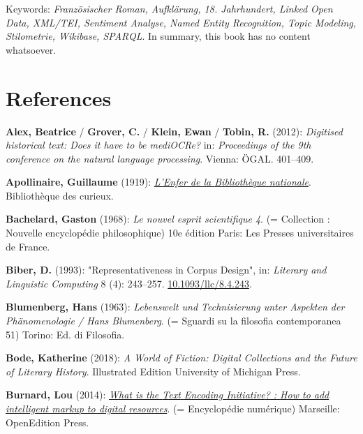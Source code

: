 \documentclass[
  12pt,
  letterpaper,
  DIV=11,
  numbers=noendperiod]{scrreprt}
\newlength{\cslhangindent}
\newenvironment{CSLReferences}[2] %
 {\begin{list}{}{%
  \setlength{\itemindent}{0pt}
  \setlength{\leftmargin}{0pt}
  \setlength{\parsep}{0pt}
  \ifodd #1
   \setlength{\leftmargin}{\cslhangindent}
   \setlength{\itemindent}{-1\cslhangindent}
  \fi
  \setlength{\itemsep}{#2\baselineskip}}}
 {\end{list}}
\begin{document}
Keywords: \emph{Französischer Roman, Aufklärung, 18. Jahrhundert, Linked
Open Data, XML/TEI, Sentiment Analyse, Named Entity Recognition, Topic
Modeling, Stilometrie, Wikibase, SPARQL}. In summary, this book has no
content whatsoever.


\chapter{References}\label{references}

\label{refs}
\begin{CSLReferences}{1}{0}
\textbf{Alex, Beatrice} / \textbf{Grover, C.} / \textbf{Klein, Ewan} /
\textbf{Tobin, R.} (2012): \emph{Digitised historical text: {Does} it
have to be {mediOCRe}?} in: \emph{Proceedings of the 9th conference on
the natural language processing}. Vienna: ÖGAL. 401--409.

\textbf{Apollinaire, Guillaume} (1919):
\emph{\href{https://fr.wikisource.org/wiki/Livre:Apollinaire_-_L\%E2\%80\%99Enfer_de_la_Biblioth\%C3\%A8que_nationale.djvu}{L'{Enfer}
de la {Bibliothèque} nationale}}. Bibliothèque des curieux.

\textbf{Bachelard, Gaston} (1968): \emph{Le nouvel esprit scientifique
4}. (= Collection : {Nouvelle} encyclopédie philosophique) 10e édition
Paris: Les Presses universitaires de France.

\textbf{Biber, D.} (1993): "Representativeness in {Corpus} {Design}",
in: \emph{Literary and Linguistic Computing} 8 (4): 243--257.
\href{https://doi.org/10.1093/llc/8.4.243}{10.1093/llc/8.4.243}.

\textbf{Blumenberg, Hans} (1963): \emph{Lebenswelt und {Technisierung}
unter {Aspekten} der {Phänomenologie} / {Hans} {Blumenberg}}. (= Sguardi
su la filosofia contemporanea 51) Torino: Ed. di Filosofia.

\textbf{Bode, Katherine} (2018): \emph{A {World} of {Fiction}: {Digital}
{Collections} and the {Future} of {Literary} {History}}. Illustrated
Edition University of Michigan Press.

\textbf{Burnard, Lou} (2014):
\emph{\href{http://books.openedition.org/oep/426}{What is the {Text}
{Encoding} {Initiative}? : {How} to add intelligent markup to digital
resources}}. (= Encyclopédie numérique) Marseille: OpenEdition Press.


\end{CSLReferences}
\end{document}
